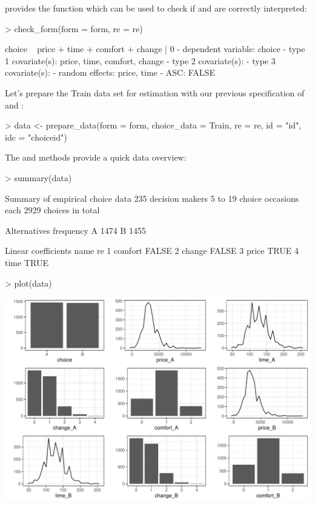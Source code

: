 \documentclass[article]{jss}
\newcommand{\fct}[1]{\code{#1()}}
\begin{document}
 provides the function \fct{check\_form} which can be used to check if  and  are correctly interpreted:

\begin{Schunk}
\begin{Sinput}
> check_form(form = form, re = re)
\end{Sinput}
\begin{Soutput}
choice ~ price + time + comfort + change | 0
- dependent variable: choice 
- type 1 covariate(s): price, time, comfort, change 
- type 2 covariate(s):  
- type 3 covariate(s):  
- random effects: price, time 
- ASC: FALSE 
\end{Soutput}
\end{Schunk}

Let's prepare the Train data set for estimation with our previous specification of  and :

\begin{Schunk}
\begin{Sinput}
> data <- prepare_data(form = form, choice_data = Train, re = re, id = "id", idc = "choiceid")
\end{Sinput}
\end{Schunk}

The \fct{summary} and \fct{plot} methods provide a quick data overview:

\begin{Schunk}
\begin{Sinput}
> summary(data)
\end{Sinput}
\begin{Soutput}
Summary of empirical choice data
235 decision makers 
5 to 19 choice occasions each 
2929 choices in total

Alternatives
  frequency
A      1474
B      1455

Linear coefficients
     name    re
1 comfort FALSE
2  change FALSE
3   price  TRUE
4    time  TRUE
\end{Soutput}
\begin{Sinput}
> plot(data)
\end{Sinput}
\end{Schunk}
\includegraphics{rprobitb_oelschlaeger_bauer-summary-plot-Train-data}
\end{document}

